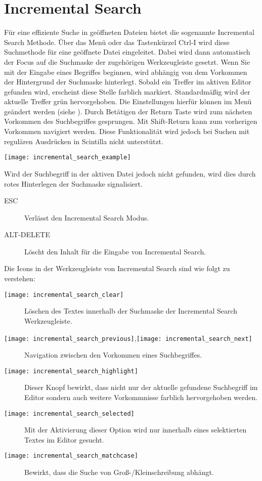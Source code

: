 \section{Incremental Search}

Für eine effiziente Suche in geöffneten Dateien bietet \codeblocks die sogenannte Incremental Search Methode. Über das Menü  oder das Tastenkürzel Ctrl-I wird diese Suchmethode für eine geöffnete Datei eingeleitet. Dabei wird dann automatisch der Focus auf die Suchmaske der zugehörigen Werkzeugleiste gesetzt. Wenn Sie mit der Eingabe eines Begriffes beginnen, wird abhängig von dem Vorkommen der Hintergrund der Suchmaske hinterlegt. Sobald ein Treffer im aktiven Editor gefunden wird, erscheint diese Stelle farblich markiert. Standardmäßig wird der aktuelle Treffer grün hervorgehoben. Die Einstellungen hierfür können im Menü  geändert werden (siehe ). Durch Betätigen der Return Taste wird zum nächsten Vorkommen des Suchbegriffes gesprungen. Mit Shift-Return kann zum vorherigen Vorkommen navigiert werden. Diese Funktionalität wird jedoch bei Suchen mit regulären Ausdrücken in Scintilla nicht unterstützt.

\texttt{[image: incremental\_search\_example]}

Wird der Suchbegriff in der aktiven Datei jedoch nicht gefunden, wird dies durch rotes Hinterlegen der Suchmaske signalisiert.

\begin{description}
\item[ESC] Verlässt den Incremental Search Modus.
\item[ALT-DELETE] Löscht den Inhalt für die Eingabe von Incremental Search.
\end{description}

Die Icons in der Werkzeugleiste von Incremental Search sind wie folgt zu verstehen:

\begin{description}
\item[\texttt{[image: incremental\_search\_clear]}] Löschen des Textes innerhalb der Suchmaske der Incremental Search Werkzeugleiste.
\item[\texttt{[image: incremental\_search\_previous]},\texttt{[image: incremental\_search\_next]}] Navigation zwischen den Vorkommen eines Suchbegriffes.
\item[\texttt{[image: incremental\_search\_highlight]}] Dieser Knopf bewirkt, dass nicht nur der aktuelle gefundene Suchbegriff im Editor sondern auch weitere Vorkommnisse farblich hervorgehoben werden.
\item[\texttt{[image: incremental\_search\_selected]}] Mit der Aktivierung dieser Option wird nur innerhalb eines selektierten Textes im Editor gesucht.
\item[\texttt{[image: incremental\_search\_matchcase]}] Bewirkt, dass die Suche von Groß-/Kleinschreibung abhängt.
\end{description}


